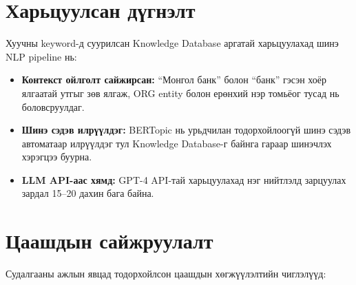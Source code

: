 \section*{Харьцуулсан дүгнэлт}

Хуучны keyword-д суурилсан Knowledge Database аргатай харьцуулахад шинэ NLP pipeline нь:
\begin{itemize}
    \item \textbf{Контекст ойлголт сайжирсан:} ``Монгол банк'' болон ``банк'' гэсэн хоёр ялгаатай утгыг зөв ялгаж, ORG entity болон ерөнхий нэр томьёог тусад нь боловсруулдаг.
    \item \textbf{Шинэ сэдэв илрүүлдэг:} BERTopic нь урьдчилан тодорхойлоогүй шинэ сэдэв автоматаар илрүүлдэг тул Knowledge Database-г байнга гараар шинэчлэх хэрэгцээ буурна.
    \item \textbf{LLM API-аас хямд:} GPT-4 API-тай харьцуулахад нэг нийтлэлд зарцуулах зардал 15--20 дахин бага байна.
\end{itemize}

\section*{Цаашдын сайжруулалт}

Судалгааны ажлын явцад тодорхойлсон цаашдын хөгжүүлэлтийн чиглэлүүд:


